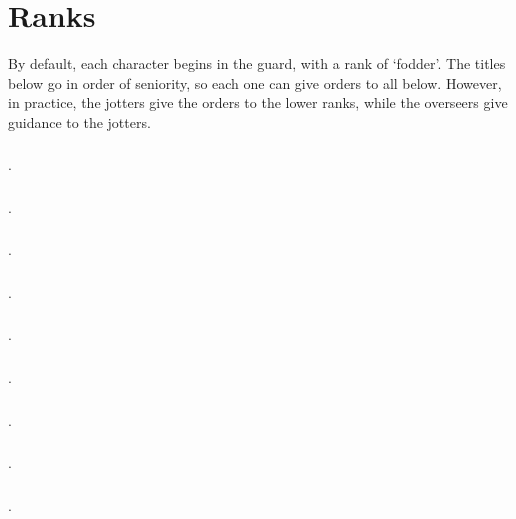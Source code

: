 \section{Ranks}

\begin{multicols}{2}

\noindent
By default, each character begins in the \gls{guard}, with a rank of `\gls{fodder}'.
The titles below go in order of seniority, so each one can give orders to all below.
However, in practice, the \glspl{jotter} give the orders to the lower ranks, while the \glspl{overseer} give guidance to the \glspl{jotter}.

\subsubsection{}
.

\subsubsection{}
.

\subsubsection{}
.

\subsubsection{}
.

\subsubsection{}
.

\subsubsection{}
.

\subsubsection{}
.

\subsubsection{}
.

\subsubsection{}
.

\end{multicols}
